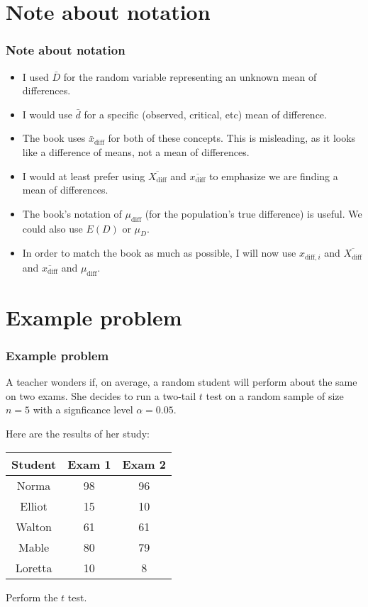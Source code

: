 \documentclass[11pt,containsverbatim,handout]{beamer}
\begin{document}
\section{Note about notation}
\begin{frame}
\frametitle{Note about notation}
\begin{itemize}
\item I used $\bar{D}$ for the random variable representing an unknown mean of differences. \pause
\item I would use $\bar{d}$ for a specific (observed, critical, etc) mean of difference. \pause
\item The book uses $\bar{x}_\text{diff}$ for both of these concepts. This is misleading, as it looks like a difference of means, not a mean of differences. \pause
\item I would at least prefer using $\overline{X_\text{diff}}$ and $\overline{x_\text{diff}}$ to emphasize we are finding a mean of differences. \pause
\item The book's notation of $\mu_\text{diff}$ (for the population's true difference) is useful. We could also use $E(D)$ or $\mu_{D}$.
\item In order to match the book as much as possible, I will now use $x_{\text{diff},i}$ and $\overline{X_\text{diff}}$ and $\overline{x_\text{diff}}$ and $\mu_\text{diff}$.
\end{itemize}
\end{frame}

\newcommand{\xdi}{x_{\text{diff},i}}
\newcommand{\bxd}{\overline{x_\text{diff}}}
\newcommand{\bXd}{\overline{X_\text{diff}}}
\newcommand{\mud}{\mu_\text{diff}}

\section{Example problem}
\begin{frame}
\frametitle{Example problem}
A teacher wonders if, on average, a random student will perform about the same on two exams. She decides to run a two-tail $t$ test on a random sample of size $n=5$ with a signficance level $\alpha=0.05$.

\pause

Here are the results of her study:
\begin{center}
\begin{tabular}{|c|c|c|} \hline
Student & Exam 1 & Exam 2 \\ \hline
Norma   & 98     & 96     \\  
Elliot  & 15     & 10     \\  
Walton  & 61     & 61     \\  
Mable   & 80     & 79     \\  
Loretta & 10     & 8      \\  \hline
\end{tabular}
\end{center}
Perform the $t$ test.
\end{frame}
\end{document}
